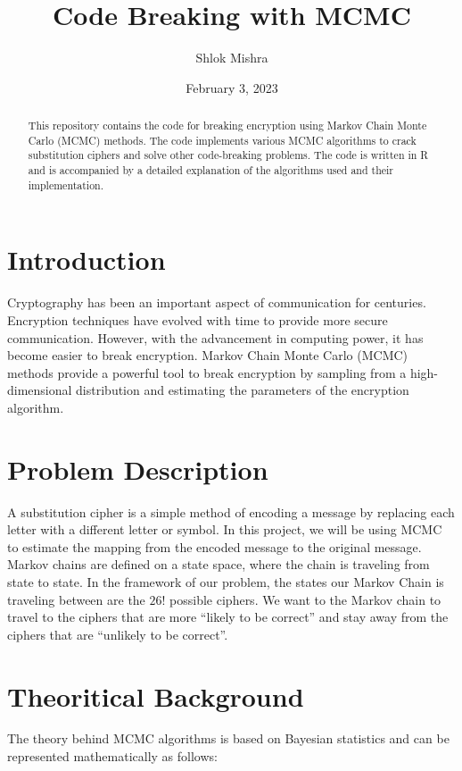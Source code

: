 \documentclass{article}
\title{Code Breaking with MCMC}
\author{Shlok Mishra}
\date{February 3, 2023}
\begin{document}
\maketitle

\begin{abstract}
This repository contains the code for breaking encryption using Markov Chain Monte Carlo (MCMC) methods. The code implements various MCMC algorithms to crack substitution ciphers and solve other code-breaking problems. The code is written in R and is accompanied by a detailed explanation of the algorithms used and their implementation.
\end{abstract}

\section{Introduction}

Cryptography has been an important aspect of communication for centuries. Encryption techniques have evolved with time to provide more secure communication. However, with the advancement in computing power, it has become easier to break encryption. Markov Chain Monte Carlo (MCMC) methods provide a powerful tool to break encryption by sampling from a high-dimensional distribution and estimating the parameters of the encryption algorithm.


\section{Problem Description}

A substitution cipher is a simple method of encoding a message by replacing each letter with a different letter or symbol. In this project, we will be using MCMC to estimate the mapping from the encoded message to the original message.
Markov chains are defined on a state space, where the chain is traveling from state to state. In the framework of our problem, the states our Markov Chain is traveling between are the $26!$ possible ciphers. We want to the Markov chain to travel to the ciphers that are more “likely to be correct” and stay away from the ciphers that are “unlikely to be correct”.

\section{Theoritical Background}

The theory behind MCMC algorithms is based on Bayesian statistics and can be represented mathematically as follows:
\end{document}
